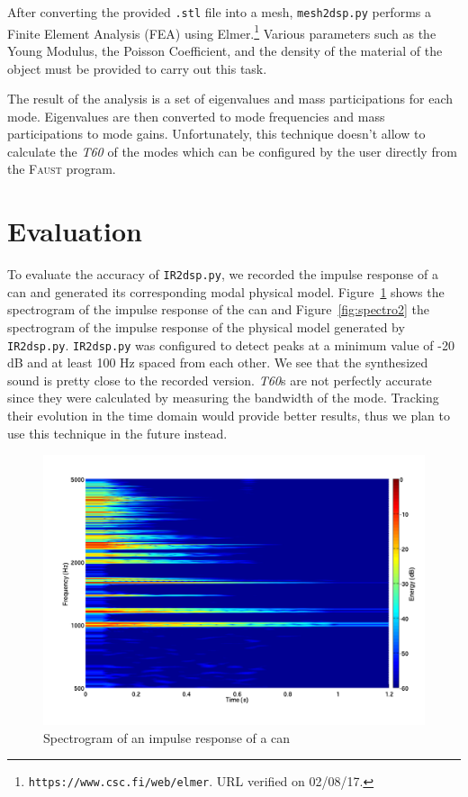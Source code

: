\documentclass[11pt,a4paper]{article}
\newcommand{\f}{\textsc{Faust}}
\begin{document}
After converting the provided \texttt{.stl} file into a mesh, \texttt{mesh2dsp.py} performs a Finite Element Analysis (FEA) using Elmer.\footnote{\texttt{https://www.csc.fi/web/elmer}. URL verified on 02/08/17.} Various parameters such as the Young Modulus, the Poisson Coefficient, and the density of the material of the object must be provided to carry out this task.

The result of the analysis is a set of eigenvalues and mass participations for each mode. Eigenvalues are then converted to mode frequencies and mass participations to mode gains. Unfortunately, this technique doesn't allow to calculate the \textit{T60} of the modes which can be configured by the user directly from the \f{} program. 

\section{Evaluation}

To evaluate the accuracy of \texttt{IR2dsp.py}, we recorded the impulse response of a can and generated its corresponding modal physical model. Figure~\ref{fig:spectro1} shows the spectrogram of the impulse response of the can and Figure~\ref{fig:spectro2} the spectrogram of the impulse response of the physical model generated by \texttt{IR2dsp.py}. \texttt{IR2dsp.py} was configured to detect peaks at a minimum value of -20 dB and at least 100 Hz spaced from each other. We see that the synthesized sound is pretty close to the recorded version. \textit{T60}s are not perfectly accurate since they were calculated by measuring the bandwidth of the mode. Tracking their evolution in the time domain would provide better results, thus we plan to use this technique in the future instead.

\begin{figure}[htbp]
  \centering
  \includegraphics[width=\columnwidth]{pictures/canIR}
  \caption{Spectrogram of an impulse response of a can}
  \label{fig:spectro1}
\end{figure}
\end{document}
